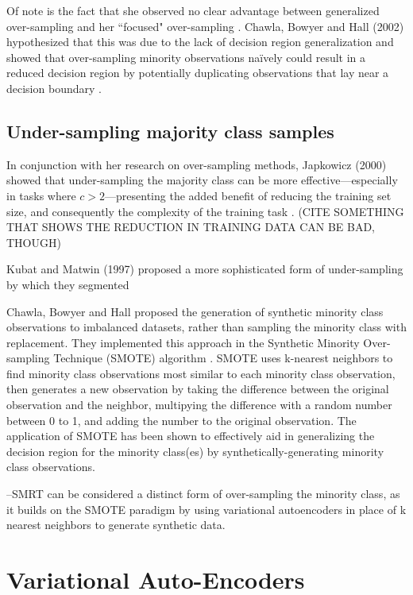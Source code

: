 \documentclass[twoside,11pt]{article}
\begin{document}
Of note is the fact that she observed no clear advantage between generalized over-sampling and her ``focused" over-sampling \citep{japkowicz2000learning}. Chawla, Bowyer and Hall (2002) hypothesized that this was due to the lack of decision region generalization and showed that over-sampling minority observations na\"ively could result in a reduced decision region by potentially duplicating observations that lay near a decision boundary \citep{chawla2002smote}.


\subsection{Under-sampling majority class samples}

In conjunction with her research on over-sampling methods, Japkowicz (2000) showed that under-sampling the majority class can be more effective---especially in tasks where $c > 2$---presenting the added benefit of reducing the training set size, and consequently the complexity of the training task \citep{japkowicz2000learning}. (CITE SOMETHING THAT SHOWS THE REDUCTION IN TRAINING DATA CAN BE BAD, THOUGH)

Kubat and Matwin (1997) proposed a more sophisticated form of under-sampling by which they segmented \citep{kubat1997addressing}

Chawla, Bowyer and Hall proposed the generation of synthetic minority class observations to imbalanced datasets, rather than sampling the minority class with replacement.  They implemented this approach in the Synthetic Minority Over-sampling Technique (SMOTE) algorithm \citep{chawla2002smote}. SMOTE uses k-nearest neighbors to find minority class observations most similar to each minority class observation, then generates a new observation by taking the difference between the original observation and the neighbor, multipying the difference with a random number between 0 to 1, and adding the number to the original observation. The application of SMOTE has been shown to effectively aid in generalizing the decision region for the minority class(es) by synthetically-generating minority class observations.  

--SMRT can be considered a distinct form of over-sampling the minority class, as it builds on the SMOTE paradigm by using variational autoencoders in place of k nearest neighbors to generate synthetic data. 

\section{Variational Auto-Encoders}
\end{document}
